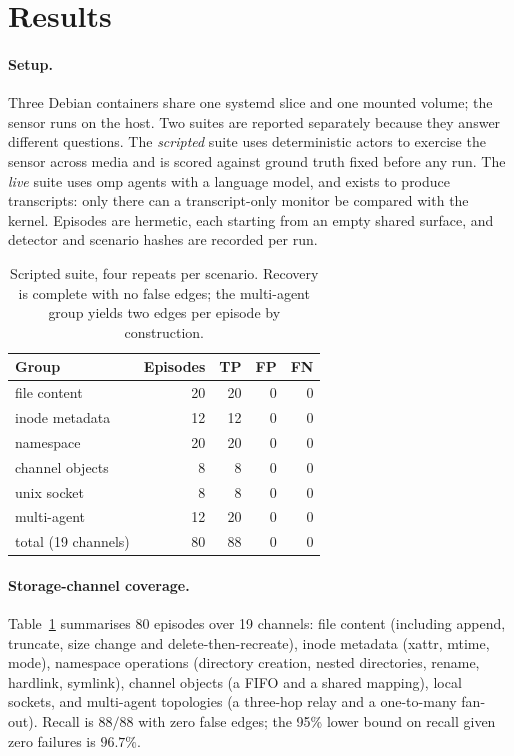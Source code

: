 \section{Results}

\paragraph{Setup.} Three Debian containers share one systemd slice and one
mounted volume; the sensor runs on the host. Two suites are reported separately
because they answer different questions. The \emph{scripted} suite uses
deterministic actors to exercise the sensor across media and is scored against
ground truth fixed before any run. The \emph{live} suite uses omp agents with a
language model, and exists to produce transcripts: only there can a
transcript-only monitor be compared with the kernel. Episodes are hermetic, each
starting from an empty shared surface, and detector and scenario hashes are
recorded per run.

\begin{table}[t]
\centering
\small
\begin{tabular}{@{}lrrrr@{}}
\toprule
Group & Episodes & TP & FP & FN \\
\midrule
file content        & 20 & 20 & 0 & 0 \\
inode metadata      & 12 & 12 & 0 & 0 \\
namespace           & 20 & 20 & 0 & 0 \\
channel objects     &  8 &  8 & 0 & 0 \\
unix socket         &  8 &  8 & 0 & 0 \\
multi-agent         & 12 & 20 & 0 & 0 \\
\midrule
total (19 channels) & 80 & 88 & 0 & 0 \\
\bottomrule
\end{tabular}
\caption{Scripted suite, four repeats per scenario. Recovery is complete with no
false edges; the multi-agent group yields two edges per episode by construction.}
\label{tab:scripted}
\end{table}

\paragraph{Storage-channel coverage.} Table~\ref{tab:scripted} summarises 80
episodes over 19 channels: file content (including append, truncate, size change
and delete-then-recreate), inode metadata (xattr, mtime, mode), namespace
operations (directory creation, nested directories, rename, hardlink, symlink),
channel objects (a FIFO and a shared mapping), local sockets, and multi-agent
topologies (a three-hop relay and a one-to-many fan-out). Recall is $88/88$ with
zero false edges; the 95\% lower bound on recall given zero failures is $96.7\%$.

